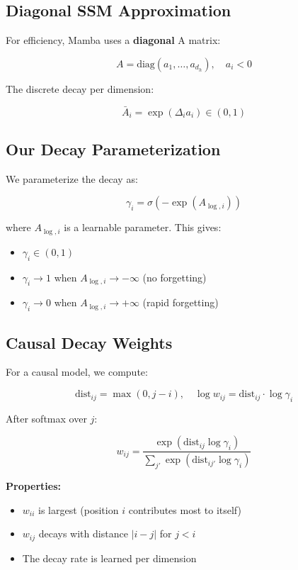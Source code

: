 \subsection{Diagonal SSM Approximation}

For efficiency, Mamba uses a \textbf{diagonal} A matrix:

\[
A = \text{diag}(a_1, \dots, a_{d_h}), \quad a_i < 0
\tag{3.5}
\]

The discrete decay per dimension:

\[
\bar{A}_i = \exp(\Delta_i a_i) \in (0, 1)
\tag{3.6}
\]

\subsection{Our Decay Parameterization}

We parameterize the decay as:

\[
\gamma_i = \sigma(-\exp(A_{\log, i}))
\tag{3.7}
\]

where $A_{\log, i}$ is a learnable parameter. This gives:

\begin{itemize}
\item $\gamma_i \in (0, 1)$
\item $\gamma_i \to 1$ when $A_{\log, i} \to -\infty$ (no forgetting)
\item $\gamma_i \to 0$ when $A_{\log, i} \to +\infty$ (rapid forgetting)

\end{itemize}
\subsection{Causal Decay Weights}

For a causal model, we compute:

\[
\text{dist}_{ij} = \max(0, j - i), \quad
\log w_{ij} = \text{dist}_{ij} \cdot \log \gamma_i
\tag{3.8}
\]

After softmax over $j$:

\[
w_{ij} = \frac{\exp(\text{dist}_{ij} \log \gamma_i)}{\sum_{j'} \exp(\text{dist}_{ij'} \log \gamma_i)}
\tag{3.9}
\]

\textbf{Properties:}
\begin{itemize}
\item $w_{ii}$ is largest (position $i$ contributes most to itself)
\item $w_{ij}$ decays with distance $|i - j|$ for $j < i$
\item The decay rate is learned per dimension

\end{itemize}
